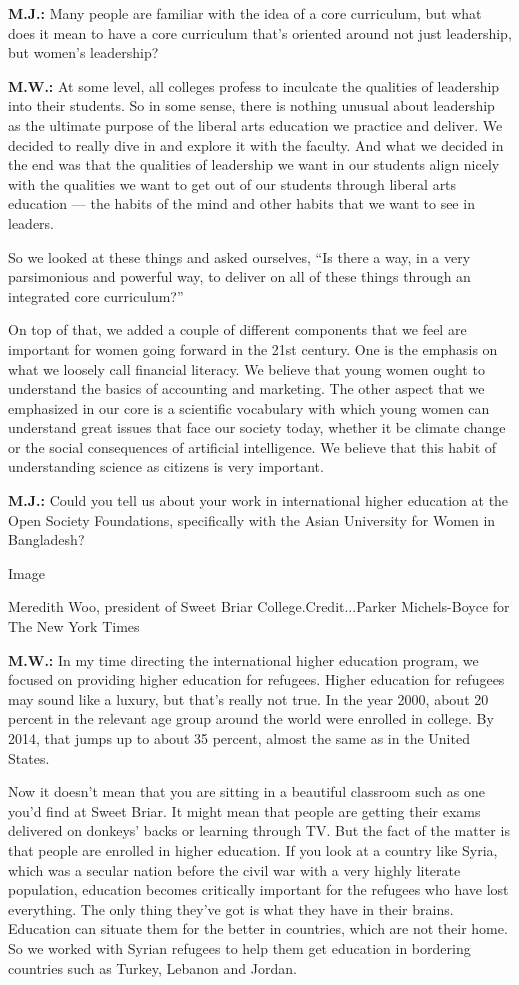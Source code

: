 \textbf{M.J.:} Many people are familiar with the idea of a core
curriculum, but what does it mean to have a core curriculum that's
oriented around not just leadership, but women's leadership?

\textbf{M.W.:} At some level, all colleges profess to inculcate the
qualities of leadership into their students. So in some sense, there is
nothing unusual about leadership as the ultimate purpose of the liberal
arts education we practice and deliver. We decided to really dive in and
explore it with the faculty. And what we decided in the end was that the
qualities of leadership we want in our students align nicely with the
qualities we want to get out of our students through liberal arts
education --- the habits of the mind and other habits that we want to
see in leaders.

So we looked at these things and asked ourselves, ``Is there a way, in a
very parsimonious and powerful way, to deliver on all of these things
through an integrated core curriculum?''

On top of that, we added a couple of different components that we feel
are important for women going forward in the 21st century. One is the
emphasis on what we loosely call financial literacy. We believe that
young women ought to understand the basics of accounting and marketing.
The other aspect that we emphasized in our core is a scientific
vocabulary with which young women can understand great issues that face
our society today, whether it be climate change or the social
consequences of artificial intelligence. We believe that this habit of
understanding science as citizens is very important.

\textbf{M.J.:} Could you tell us about your work in international higher
education at the Open Society Foundations, specifically with the Asian
University for Women in Bangladesh?

Image

Meredith Woo, president of Sweet Briar College.Credit...Parker
Michels-Boyce for The New York Times

\textbf{M.W.:} In my time directing the international higher education
program, we focused on providing higher education for refugees. Higher
education for refugees may sound like a luxury, but that's really not
true. In the year 2000, about 20 percent in the relevant age group
around the world were enrolled in college. By 2014, that jumps up to
about 35 percent, almost the same as in the United States.

Now it doesn't mean that you are sitting in a beautiful classroom such
as one you'd find at Sweet Briar. It might mean that people are getting
their exams delivered on donkeys' backs or learning through TV. But the
fact of the matter is that people are enrolled in higher education. If
you look at a country like Syria, which was a secular nation before the
civil war with a very highly literate population, education becomes
critically important for the refugees who have lost everything. The only
thing they've got is what they have in their brains. Education can
situate them for the better in countries, which are not their home. So
we worked with Syrian refugees to help them get education in bordering
countries such as Turkey, Lebanon and Jordan.

